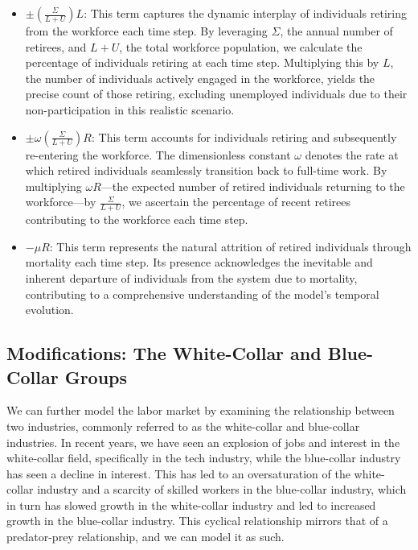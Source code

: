 \documentclass[11pt]{amsart}
\begin{document}
\begin{itemize}
    \item $\pm\left(\frac{\Sigma}{L + U}\right) L$: This term captures the dynamic interplay of individuals retiring from the workforce each time step. By leveraging $\Sigma$, the annual number of retirees, and $L + U$, the total workforce population, we calculate the percentage of individuals retiring at each time step. Multiplying this by $L$, the number of individuals actively engaged in the workforce, yields the precise count of those retiring, excluding unemployed individuals due to their non-participation in this realistic scenario.

    \item $\pm \omega\left(\frac{\Sigma}{L + U}\right) R$: This term accounts for individuals retiring and subsequently re-entering the workforce. The dimensionless constant $\omega$ denotes the rate at which retired individuals seamlessly transition back to full-time work. By multiplying $\omega R$—the expected number of retired individuals returning to the workforce—by $\frac{\Sigma}{L + U}$, we ascertain the percentage of recent retirees contributing to the workforce each time step.

    \item $-\mu R$: This term represents the natural attrition of retired individuals through mortality each time step. Its presence acknowledges the inevitable and inherent departure of individuals from the system due to mortality, contributing to a comprehensive understanding of the model's temporal evolution.
\end{itemize}

\subsection{Modifications: The White-Collar and Blue-Collar Groups}

We can further model the labor market by examining the relationship between two industries, commonly referred to as the white-collar and blue-collar industries.
In recent years, we have seen an explosion of jobs and interest in the white-collar field, specifically in the tech industry, while the blue-collar industry has seen a decline in interest.
This has led to an oversaturation of the white-collar industry and a scarcity of skilled workers in the blue-collar industry, which in turn has slowed growth in the white-collar industry and led to increased growth in the blue-collar industry.
This cyclical relationship mirrors that of a predator-prey relationship, and we can model it as such.
\end{document}

